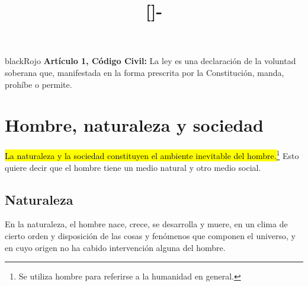 \documentclass{templateApunte}
\newcommand{\hlcolor}[2]{{\sethlcolor{#1}\hl{#2}}}
\newcounter{counter_comentario}
\newcounter{counter_observacion}
\begin{document}
\setcounter{counter_comentario}{1}
\setcounter{counter_observacion}{1}


\title{[\asignatura]-\titulo}
\author{
    \autor
}
\portada
\margenes %

\begin{center}
  \begin{cPB}{black}{Rojo}
    \large
    \textbf{Artículo 1, Código Civil:}
    \newline
    La ley es una declaración de la voluntad soberana que, manifestada en la forma prescrita por la Constitución, manda, prohíbe o permite.
  \end{cPB}
\end{center}

\section{Hombre, naturaleza y sociedad}
\hlcolor{Amarillo!80}{La naturaleza y la sociedad constituyen el ambiente inevitable del hombre.}\footnote{Se utiliza hombre para referirse a la humanidad en general.}
Esto quiere decir que el hombre tiene un medio natural y otro medio social.

\subsection{Naturaleza}
En la naturaleza, el hombre nace, crece, se desarrolla y muere, en un clima de cierto orden y disposición de las cosas y fenómenos que componen el universo, y en cuyo origen no ha cabido intervención alguna del hombre.
\end{document}
